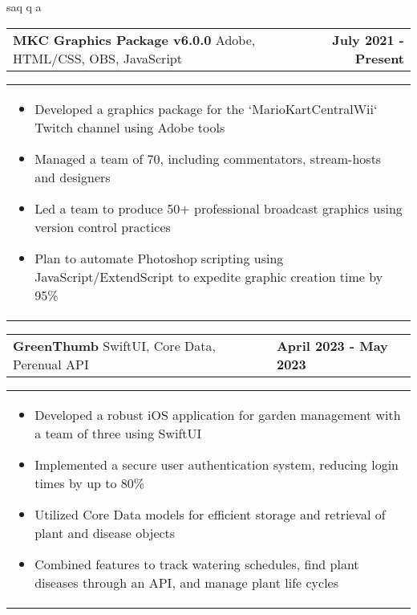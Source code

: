\documentclass[10pt]{article}
\begin{document}
\vspace{-5pt}

    saq q   a
\noindent \begin{tabularx}{\textwidth}{X r}
\textbf{MKC Graphics Package v6.0.0} \textbar{} Adobe, HTML/CSS, OBS, JavaScript & \textbf{July 2021 - Present} \\
\end{tabularx}

\vspace{-5pt}

\noindent \begin{tabularx}{\textwidth}{X}
\begin{itemize}[leftmargin=0.75cm, noitemsep, topsep=0pt, parsep=0pt, partopsep=0pt]
\item Developed a graphics package for the `MarioKartCentralWii` Twitch channel using Adobe tools
\item Managed a team of 70, including commentators, stream-hosts and designers
\item Led a team to produce 50+ professional broadcast graphics using version control practices
\item Plan to automate Photoshop scripting using JavaScript/ExtendScript to expedite graphic creation time by 95\%
\end{itemize}
\end{tabularx}

\vspace{-5pt}


\noindent \begin{tabularx}{\textwidth}{X >{\raggedleft\arraybackslash}X}
\textbf{GreenThumb} \textbar{} SwiftUI, Core Data, Perenual API & \textbf{April 2023 - May 2023} \\
\end{tabularx}

\vspace{-5pt}

\noindent \begin{tabularx}{\textwidth}{X}
\begin{itemize}[leftmargin=0.75cm, noitemsep, topsep=0pt, parsep=0pt, partopsep=0pt]
\item Developed a robust iOS application for garden management with a team of three using SwiftUI
\item Implemented a secure user authentication system, reducing login times by up to 80\%
\item Utilized Core Data models for efficient storage and retrieval of plant and disease objects
\item Combined features to track watering schedules, find plant diseases through an API, and manage plant life cycles
\end{itemize}
\end{tabularx}
\end{document}
